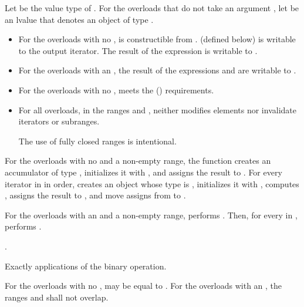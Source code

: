 \begin{itemdescr}
\pnum
Let  be the value type of .
For the overloads that do not take an argument ,
let  be an lvalue
that denotes an object of type .

\pnum
\mandates
\begin{itemize}
\item
  For the overloads with no ,
   is constructible from .
   (defined below) is
  writable
  to the  output iterator.
  The result of the expression 
  is writable to .
\item
  For the overloads with an ,
  the result of the expressions  and
   are writable to .
\end{itemize}

\pnum
\expects
\begin{itemize}
\item
  For the overloads with no ,
   meets the  ()
  requirements.
\item
  For all overloads, in the ranges 
  and ,
   neither modifies elements
  nor invalidate iterators or subranges.
\begin{footnote}
The use of fully closed ranges is intentional.
\end{footnote}
\end{itemize}

\pnum
\effects
For the overloads with no  and a non-empty range,
the function creates an accumulator  of type ,
initializes it with ,
and assigns the result to .
For every iterator  in  in order,
creates an object  whose type is ,
initializes it with ,
computes ,
assigns the result to , and
move assigns from  to .

\pnum
For the overloads with an  and a non-empty range,
performs .
Then, for every  in ,
performs .

\pnum
\returns
{}.

\pnum
\complexity
Exactly  applications of the binary operation.

\pnum
\remarks
For the overloads with no ,
 may be equal to .
For the overloads with an ,
the ranges  and 
shall not overlap.
\end{itemdescr}

